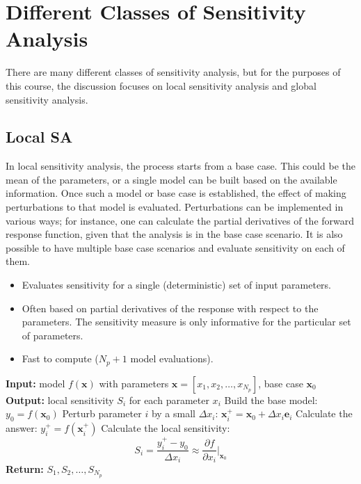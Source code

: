 \section{Different Classes of Sensitivity Analysis}

There are many different classes of sensitivity analysis, but for the purposes of this course, the discussion focuses on local sensitivity analysis and global sensitivity analysis.

\subsection{Local SA}
In local sensitivity analysis, the process starts from a base case. This could be the mean of the parameters, or a single model can be built based on the available information. Once such a model or base case is established, the effect of making perturbations to that model is evaluated. Perturbations can be implemented in various ways; for instance, one can calculate the partial derivatives of the forward response function, given that the analysis is in the base case scenario. It is also possible to have multiple base case scenarios and evaluate sensitivity on each of them.

\begin{itemize}
    \item Evaluates sensitivity for a single (deterministic) set of input parameters.
    \item Often based on partial derivatives of the response with respect to the parameters. The sensitivity measure is only informative for the particular set of parameters.
    \item Fast to compute ($N_p + 1$ model evaluations).
\end{itemize}
\begin{algorithm}[H]
\caption{Local Sensitivity Analysis (LSA)}
\begin{algorithmic}[1]
\State \textbf{Input:} model $f(\mathbf{x})$ with parameters $\mathbf{x} = [x_1, x_2, \dots, x_{N_p}]$, base case $\mathbf{x}_0$
\State \textbf{Output:} local sensitivity $S_i$ for each parameter $x_i$
\State Build the base model: $y_0 = f(\mathbf{x}_0)$
\State Perturb parameter $i$ by a small $\Delta x_i$: $\mathbf{x}_i^+ = \mathbf{x}_0 + \Delta x_i \mathbf{e}_i$ 
\State Calculate the answer: $y_i^+ = f(\mathbf{x}_i^+)$ 
\State Calculate the local sensitivity: 
\[ 
S_i = \frac{y_i^+ - y_0}{\Delta x_i} \approx \frac{\partial f}{\partial x_i} \Big|_{\mathbf{x}_0} 
\]
\EndFor
\State \textbf{Return:} $S_1, S_2, \dots, S_{N_p}$
\end{algorithmic}
\end{algorithm}

